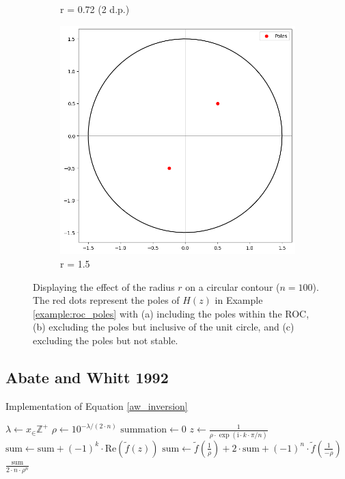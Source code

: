 \documentclass[a4paper]{report}
\begin{document}
\begin{figure}[H]
\begin{subfigure}{.25\linewidth}
      \caption{r = 0.72 (2 d.p.)}
    \end{subfigure}\hfill
    \begin{subfigure}{.25\linewidth}
      \includegraphics[width=\linewidth]{images/unstable_contour.png}
      \caption{r = 1.5}
    \end{subfigure}\hfill
    
    \caption{ Displaying the effect of the radius $r$ on a circular contour ($n = 100$). The red dots represent the poles of $H(z)$ in Example \ref{example:roc_poles} with (a) including the poles within the ROC, (b) excluding the poles but inclusive of the unit circle, and (c) excluding the poles but not stable.}
\end{figure}

\subsection{Abate and Whitt 1992}

\begin{algorithm}[H]
    \caption{Implementation of Equation \ref{aw_inversion}}
    \begin{algorithmic}[1]
        \State $\lambda \gets x_\in \mathbb{Z}^+$
        \State $\rho \gets 10^{-\lambda / (2 \cdot n)}$
        \State $\text{summation} \gets 0$
            \State $z \gets \frac{1}{\rho \cdot \exp(\text{i} \cdot k \cdot \pi / n)}$
            \State $\text{sum} \gets \text{sum} + (-1)^k \cdot \text{Re}(\tilde{f}(z))$
        \EndFor
        \State $\text{sum} \gets \tilde{f}(\frac{1}{\rho}) + 2 \cdot \text{sum} + (-1)^n \cdot \tilde{f}(\frac{1}{-\rho})$
        \State \Return $\frac{\text{sum}}{2 \cdot n \cdot \rho^n}$
    \EndProcedure
    \end{algorithmic}
\end{algorithm}
\end{document}
